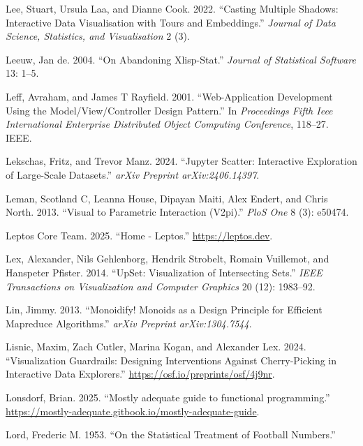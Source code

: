 \documentclass[
  openany]{book}
\newlength{\cslhangindent}
\newenvironment{CSLReferences}[2] %
 {\begin{list}{}{%
  \setlength{\itemindent}{0pt}
  \setlength{\leftmargin}{0pt}
  \setlength{\parsep}{0pt}
  \ifodd #1
   \setlength{\leftmargin}{\cslhangindent}
   \setlength{\itemindent}{-1\cslhangindent}
  \fi
  \setlength{\itemsep}{#2\baselineskip}}}
 {\end{list}}
\theoremstyle{definition}
\theoremstyle{definition}
\theoremstyle{definition}
\theoremstyle{definition}
\theoremstyle{remark}
\begin{document}
\begin{CSLReferences}{1}{0}
Lee, Stuart, Ursula Laa, and Dianne Cook. 2022. {``Casting Multiple Shadows: Interactive Data Visualisation with Tours and Embeddings.''} \emph{Journal of Data Science, Statistics, and Visualisation} 2 (3).

Leeuw, Jan de. 2004. {``On Abandoning Xlisp-Stat.''} \emph{Journal of Statistical Software} 13: 1--5.

Leff, Avraham, and James T Rayfield. 2001. {``Web-Application Development Using the Model/View/Controller Design Pattern.''} In \emph{Proceedings Fifth Ieee International Enterprise Distributed Object Computing Conference}, 118--27. IEEE.

Lekschas, Fritz, and Trevor Manz. 2024. {``Jupyter Scatter: Interactive Exploration of Large-Scale Datasets.''} \emph{arXiv Preprint arXiv:2406.14397}.

Leman, Scotland C, Leanna House, Dipayan Maiti, Alex Endert, and Chris North. 2013. {``Visual to Parametric Interaction (V2pi).''} \emph{PloS One} 8 (3): e50474.

Leptos Core Team. 2025. {``{Home - Leptos}.''} \url{https://leptos.dev}.

Lex, Alexander, Nils Gehlenborg, Hendrik Strobelt, Romain Vuillemot, and Hanspeter Pfister. 2014. {``UpSet: Visualization of Intersecting Sets.''} \emph{IEEE Transactions on Visualization and Computer Graphics} 20 (12): 1983--92.

Lin, Jimmy. 2013. {``Monoidify! Monoids as a Design Principle for Efficient Mapreduce Algorithms.''} \emph{arXiv Preprint arXiv:1304.7544}.

Lisnic, Maxim, Zach Cutler, Marina Kogan, and Alexander Lex. 2024. {``Visualization Guardrails: Designing Interventions Against Cherry-Picking in Interactive Data Explorers.''} \url{https://osf.io/preprints/osf/4j9nr}.

Lonsdorf, Brian. 2025. {``{Mostly adequate guide to functional programming}.''} \url{https://mostly-adequate.gitbook.io/mostly-adequate-guide}.

Lord, Frederic M. 1953. {``On the Statistical Treatment of Football Numbers.''}


\end{CSLReferences}
\end{document}
